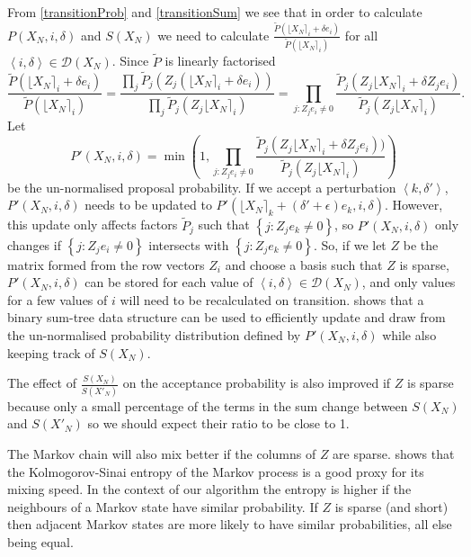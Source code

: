 \documentclass{article}
\begin{document}
From \eqref{transitionProb} and \eqref{transitionSum} we see that in order to calculate $P(X_N,i,\delta)$ and $S(X_N)$ we need to calculate $\frac{\tilde{P}(\lfloor X_N \rceil_i + \delta e_i)}{\tilde{P}(\lfloor X_N \rceil_i)}$ for all $\left<i,\delta\right> \in \mathcal{D}(X_N)$.  Since $\tilde{P}$ is linearly factorised
\[
\frac{\tilde{P}(\lfloor X_N \rceil_i + \delta e_i)}{\tilde{P}(\lfloor X_N \rceil_i)} =
\frac{\prod_j \tilde{P}_j(Z_j(\lfloor X_N \rceil_i + \delta e_i))}{\prod_j \tilde{P}_j(Z_j\lfloor X_N \rceil_i)} =
\prod_{j : Z_j e_i \ne 0} \frac{\tilde{P}_j(Z_j \lfloor X_N \rceil_i + \delta Z_j e_i)}{\tilde{P}_j(Z_j \lfloor X_N \rceil_i)}.
\]
Let
\[
P'(X_N,i,\delta) = \min\left(1, 
\prod_{j : Z_je_i \ne 0} \frac{\tilde{P}_j(Z_j \lfloor X_N \rceil_i + \delta Z_j e_i))}{\tilde{P}_j(Z_j \lfloor X_N \rceil_i)}\right)
\]
be the un-normalised proposal probability. If we accept a perturbation $\left<k,\delta'\right>$, $P'(X_N,i,\delta)$ needs to be updated 
to $P'(\lfloor X_N \rceil_k + (\delta'+\epsilon)e_k, i, \delta)$. However, this update only affects factors $\tilde{P}_j$ such that  $\left\{j : Z_j e_k \ne 0 \right\}$, so $P'(X_N,i,\delta)$ only changes if $\left\{j : Z_je_i \ne 0\right\}$ intersects with $\left\{j : Z_je_k \ne 0\right\}$. So, if we let $Z$ be the matrix formed from the row vectors $Z_i$ and choose a basis such that $Z$ is sparse, $P'(X_N,i,\delta)$ can be stored for each value of $\left<i,\delta\right> \in \mathcal{D}(X_N)$, and only values for a few values of $i$ will need to be recalculated on transition. \citet{TangMutableCategorical} shows that a binary sum-tree data structure can be used to efficiently update and draw from the un-normalised probability distribution defined by $P'(X_N,i,\delta)$ while also keeping track of $S(X_N)$.
 
The effect of $\frac{S(X_N)}{S(X'_N)}$ on the acceptance probability is also improved if $Z$ is sparse because only a small percentage of the terms in the sum change between $S(X_N)$ and $S(X'_N)$ so we should expect their ratio to be close to 1.

The Markov chain will also mix better if the columns of $Z$ are sparse. \citet{mihelich2018maximum} shows that the Kolmogorov-Sinai entropy of the Markov process is a good proxy for its mixing speed. In the context of our algorithm the entropy is higher if the neighbours of a Markov state have similar probability. If $Z$ is sparse (and short) then adjacent Markov states are more likely to have similar probabilities, all else being equal.
\end{document}
